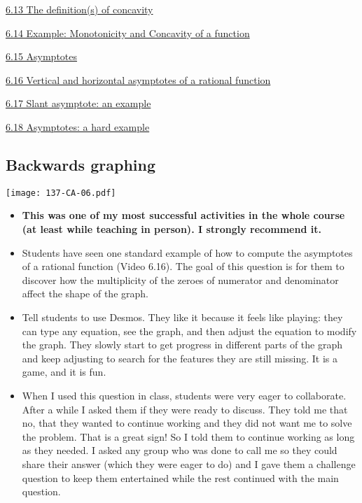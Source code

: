 \documentclass[11pt]{article}
\newcommand{\nl}{\hfill \vspace{-1.1\baselineskip}} %
\newcommand{\vxiii}{\hspace{8mm} \href{https://www.youtube.com/watch?v=4Dh6KdQDRkw&list=PLlwePzQY_wW9EsqbQzPdJTNGsHYvO_2CJ&index=13}{6.13 The definition(s) of concavity}}
\newcommand{\vxiv}{\hspace{8mm} \href{https://www.youtube.com/watch?v=ZodaIjLuhI8&list=PLlwePzQY_wW9EsqbQzPdJTNGsHYvO_2CJ&index=14}{6.14 Example: Monotonicity and Concavity of a function}}
\newcommand{\vxv}{\hspace{8mm} \href{https://www.youtube.com/watch?v=PG41kUSC0w0&list=PLlwePzQY_wW9EsqbQzPdJTNGsHYvO_2CJ&index=15}{6.15 Asymptotes}}
\newcommand{\vxvi}{\hspace{8mm} \href{https://www.youtube.com/watch?v=gzoTke-bby4&list=PLlwePzQY_wW9EsqbQzPdJTNGsHYvO_2CJ&index=16}{6.16 Vertical and horizontal asymptotes of a rational function}}
\newcommand{\vxvii}{\hspace{8mm} \href{https://www.youtube.com/watch?v=UTFOz-4GZYs&list=PLlwePzQY_wW9EsqbQzPdJTNGsHYvO_2CJ&index=17}{6.17 Slant asymptote: an example}}
\newcommand{\vxviii}{\hspace{8mm} \href{https://www.youtube.com/watch?v=5Obe9JUFtEg&list=PLlwePzQY_wW9EsqbQzPdJTNGsHYvO_2CJ&index=18}{6.18 Asymptotes: a hard example}}
\begin{document}
\begin{videos}
\vxiii

\vxiv

\vxv

\vxvi

\vxvii

\vxviii
\end{videos}

\newpage

\subsection{Backwards graphing}

\begin{center}
{ \texttt{[image: 137-CA-06.pdf]}}
\end{center}


\begin{comments}
\nl
	\begin{itemize}
		\item  \textbf{This was one of my most successful activities in the whole course (at least while teaching in person).  I strongly recommend it.}
		
		\item  Students have seen one standard example of how to compute the asymptotes of a rational function (Video 6.16).  The goal of this question is for them to discover how the multiplicity of the zeroes of numerator and denominator affect the shape of the graph.

		\item Tell students to use Desmos.  They like it because it feels like playing: they can type any equation, see the graph, and then adjust the equation to modify the graph.  They slowly start to get progress in different parts of the graph and keep adjusting to search for the features they are still missing.  It is a game, and it is fun.
		
		\item When I used this question in class, students were very eager to collaborate.  After a while I asked them if they were ready to discuss.  They told me that no, that they wanted to continue working and they did not want me to solve the problem.  That is a great sign!  So I told them to continue working as long as they needed.  I asked any group who was done to call me so they could share their answer (which they were eager to do) and I gave them a challenge question to keep them entertained while the rest continued with the main question.
	\end{itemize}
\end{comments}
\end{document}
